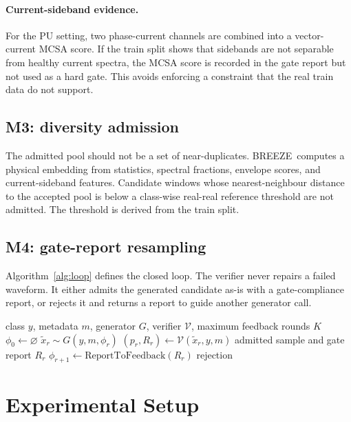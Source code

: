 \documentclass[review,3p,times]{elsarticle}
\newcommand{\breeze}{BREEZE}
\begin{document}
\paragraph{Current-sideband evidence.}
For the PU setting, two phase-current channels are combined into a
vector-current MCSA score. If the train split shows that sidebands are not
separable from healthy current spectra, the MCSA score is recorded in the
gate report but not used as a hard gate. This avoids enforcing a constraint
that the real train data do not support.

\subsection{M3: diversity admission}

The admitted pool should not be a set of near-duplicates. \breeze\ computes a
physical embedding from statistics, spectral fractions, envelope scores, and
current-sideband features. Candidate windows whose nearest-neighbour distance
to the accepted pool is below a class-wise real-real reference threshold are
not admitted. The threshold is derived from the train split.

\subsection{M4: gate-report resampling}

Algorithm~\ref{alg:loop} defines the closed loop. The verifier never repairs a
failed waveform. It either admits the generated candidate as-is with a
gate-compliance report, or rejects it and returns a report to guide another generator
call.

\begin{algorithm}
\caption{\breeze\ closed-loop physical-gate admission}
\label{alg:loop}
\begin{algorithmic}[1]
\Require class $y$, metadata $m$, generator $G$, verifier $\mathcal{V}$,
maximum feedback rounds $K$
\State $\phi_0 \gets \varnothing$
  \State $\tilde{x}_r \sim G(y,m,\phi_r)$
  \State $(p_r,R_r)\gets\mathcal{V}(\tilde{x}_r,y,m)$
    \State \Return admitted sample and gate report $R_r$
  \EndIf
  \State $\phi_{r+1}\gets\mathrm{ReportToFeedback}(R_r)$
\EndFor
\State \Return rejection
\end{algorithmic}
\end{algorithm}

\section{Experimental Setup}
\label{sec:setup}
\end{document}
